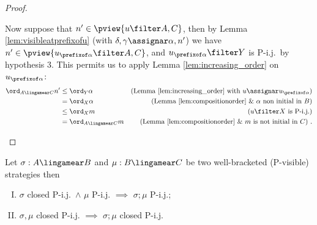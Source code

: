 \begin{proof}
\begin{enumerate}[i.]
Now suppose that $n' \in \pview{u\filter A,C}$,
then by Lemma \ref{lem:visibleatprefixofu}
(with $\delta,\gamma \assignar \alpha,n'$)
we have $n' \in \pview{u_{\prefixof \alpha}\filter A,C}$,
and $u_{\prefixof \alpha}\filter Y$ is P-i.j.\ by hypothesis 3. This permits us to apply Lemma \ref{lem:increasing_order} on $u_{\prefixof \alpha}$:
\begin{align*}
\ord_{A\lingamear C} n'
& \leq \ord_{Y} \alpha & \mbox{(Lemma \ref{lem:increasing_order} with $u\assignar u_{\prefixof \alpha}$)} \\
& = \ord_{X} \alpha & \mbox{(Lemma \ref{lem:compositionorder} \& $\alpha$ non initial in $B$)} \\
& \leq \ord_{X} m & \mbox{($u \filter X$ is P-i.j.)} \\
& = \ord_{A\lingamear C} m & \mbox{(Lemma \ref{lem:compositionorder} \& $m$ is not initial in $C$)} \ .
\end{align*}
\end{enumerate}
\end{proof}


\begin{proposition}
\label{prop:closedpijcompose} Let $\sigma : A \lingamear B$ and $\mu
: B \lingamear C$ be two well-bracketed (P-visible) strategies then
\begin{enumerate}[(I)]
\item $\sigma$ closed P-i.j.\ $\wedge$ $\mu$ P-i.j.
$\implies$ $\sigma ; \mu$  P-i.j.;
\item $\sigma, \mu$ closed P-i.j.
$\implies$ $\sigma ; \mu$ closed P-i.j.
\end{enumerate}
\end{proposition}

